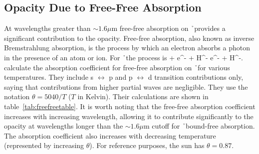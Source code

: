 \subsection{Opacity Due to Free-Free Absorption}
At wavelengths greater than $\sim1.6\mu$m free-free absorption on \h\ provides a significant contribution to the opacity.  Free-free absorption, also known as inverse Bremstrahlung absorption, is the process by which an electron absorbs a photon in the presence of an atom or ion.  For \h\ the process is
\beq
\gamma + e^- + H^- \rightarrow e^- + H^-.
\eeq
\cite{bell1987} calculate the absorption coefficient for free-free
absorption on \h\ for various temperatures.  They include s
$\leftrightarrow$ p and p $\leftrightarrow$ d transition contributions
only, saying that contributions from higher partial waves are
negligible.  They use the notation $\theta=5040 /T$ ($T$ in Kelvin). Their calculations are shown in table~\ref{tab:freefreetable}.  It is worth noting that the free-free absorption coefficient increases with increasing wavelength, allowing it to contribute significantly to the opacity at wavelengths longer than the $\sim 1.6\mu$m cutoff for \h\ bound-free absorption.  The absorption coefficient also increases with decreasing temperature (represented by increasing $\theta$).  For reference purposes,  the sun has $\theta=0.87$.
